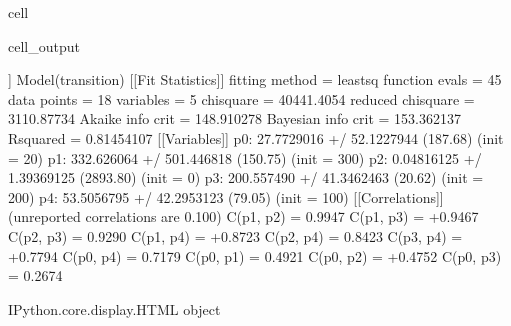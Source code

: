 \documentclass[letterpaper,10pt,english]{jupyterBook}
\begin{document}
\begin{sphinxuseclass}{cell}
\begin{sphinxVerbatimOutput}
\begin{sphinxuseclass}{cell_output}
				\begin{sphinxVerbatim}[commandchars=\\\{\}]
					[[Model]]
					Model(transition)
					[[Fit Statistics]]
					\PYGZsh{} fitting method   = leastsq
					\PYGZsh{} function evals   = 45
					\PYGZsh{} data points      = 18
					\PYGZsh{} variables        = 5
					chi\PYGZhy{}square         = 40441.4054
					reduced chi\PYGZhy{}square = 3110.87734
					Akaike info crit   = 148.910278
					Bayesian info crit = 153.362137
					R\PYGZhy{}squared          = 0.81454107
					[[Variables]]
					p\PYGZus{}0:  27.7729016 +/\PYGZhy{} 52.1227944 (187.68\PYGZpc{}) (init = 20)
					p\PYGZus{}1:  332.626064 +/\PYGZhy{} 501.446818 (150.75\PYGZpc{}) (init = 300)
					p\PYGZus{}2:  0.04816125 +/\PYGZhy{} 1.39369125 (2893.80\PYGZpc{}) (init = 0)
					p\PYGZus{}3:  200.557490 +/\PYGZhy{} 41.3462463 (20.62\PYGZpc{}) (init = 200)
					p\PYGZus{}4:  53.5056795 +/\PYGZhy{} 42.2953123 (79.05\PYGZpc{}) (init = 100)
					[[Correlations]] (unreported correlations are \PYGZlt{} 0.100)
					C(p\PYGZus{}1, p\PYGZus{}2) = \PYGZhy{}0.9947
					C(p\PYGZus{}1, p\PYGZus{}3) = +0.9467
					C(p\PYGZus{}2, p\PYGZus{}3) = \PYGZhy{}0.9290
					C(p\PYGZus{}1, p\PYGZus{}4) = +0.8723
					C(p\PYGZus{}2, p\PYGZus{}4) = \PYGZhy{}0.8423
					C(p\PYGZus{}3, p\PYGZus{}4) = +0.7794
					C(p\PYGZus{}0, p\PYGZus{}4) = \PYGZhy{}0.7179
					C(p\PYGZus{}0, p\PYGZus{}1) = \PYGZhy{}0.4921
					C(p\PYGZus{}0, p\PYGZus{}2) = +0.4752
					C(p\PYGZus{}0, p\PYGZus{}3) = \PYGZhy{}0.2674
				\end{sphinxVerbatim}
				
				\begin{sphinxVerbatim}[commandchars=\\\{\}]
					\PYGZlt{}IPython.core.display.HTML object\PYGZgt{}
				\end{sphinxVerbatim}
				

\end{sphinxuseclass}
\end{sphinxVerbatimOutput}
\end{sphinxuseclass}
\end{document}
